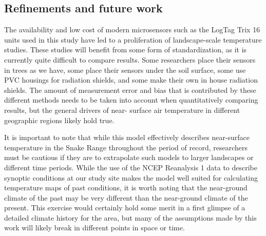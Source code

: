 \documentclass{ametsoc}
\begin{document}
\subsection{Refinements and future work}

The availability and low cost of modern microsensors such as the LogTag Trix 16
units used in this study have led to a proliferation of landscape-scale
temperature studies. These studies will benefit from some form of
standardization, as it is currently quite difficult to compare results. Some
researchers place their sensors in trees as we have, some place their sensors
under the soil surface, some use PVC housings for radiation shields, and some
make their own in house radiation shields. The amount of measurement error and
bias that is contributed by these different methods needs to be taken into
account when quantitatively comparing results, but the general drivers of near-
surface air temperature in different geographic regions likely hold true.

It is important to note that while this model effectively describes near-surface
temperature in the Snake Range throughout the period of record, researchers must
be cautious if they are to extrapolate such models to larger landscapes or
different time periods. While the use of the NCEP Reanalysis 1 data to describe
synoptic conditions at our study site makes the model well suited for
calculating temperature maps of past conditions, it is worth noting that the
near-ground climate of the past may be very different than the near-ground
climate of the present. This exercise would certainly hold some merit in a first
glimpse of a detailed climate history for the area, but many of the assumptions
made by this work will likely break in different points in space or time.


 
 
\end{document}
